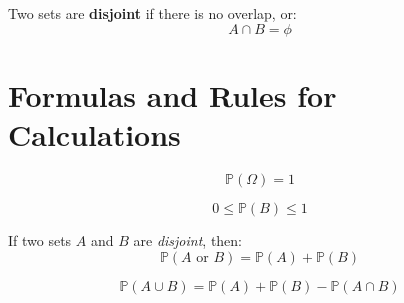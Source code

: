 \documentclass[titlepage, 12pt, leqno]{article}
\begin{document}
\begin{definition}
    Two sets are \textbf{disjoint} if there is no overlap, or:
    \[
    A \cap B = \phi 
    \]
\end{definition}

\pagebreak
\section{Formulas and Rules for Calculations}
\begin{equation}
    \mathbb{P}(\Omega) = 1
\end{equation}

\begin{equation}
    0 \le \mathbb{P}(B) \le 1
\end{equation}

If two sets $A$ and $B$ are \textit{disjoint}, then:
\begin{equation}
    \mathbb{P}(A \text{ or } B) = \mathbb{P}(A) + \mathbb{P}(B)
\end{equation}

\begin{equation}
    \mathbb{P}(A \cup B) = \mathbb{P}(A) + \mathbb{P}(B) - \mathbb{P}(A \cap B)
\end{equation}
\end{document}
